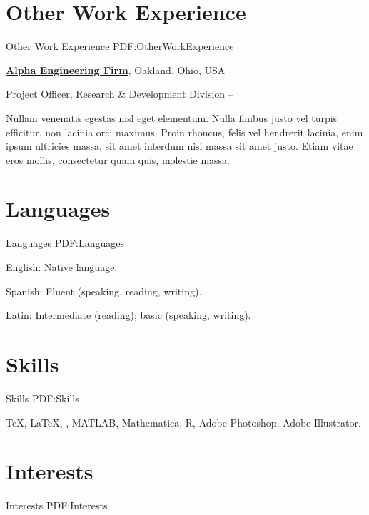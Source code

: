 \documentclass[letterpaper,MMMyyyy,nonstop]{simpleresumecv}
\begin{document}
\begin{body}

\section
{Other Work\newline
Experience}
{Other Work Experience}
{PDF:OtherWorkExperience}

\href{http://www.example.com/my-company}
{\textbf{Alpha Engineering Firm}},
Oakland, Ohio, USA

\GapNoBreak
\BulletItem
Project Officer,
Research \& Development Division
\hfill
{} --
\begin{detail}
\SubBulletItem
Nullam venenatis egestas nisl eget elementum.
\SubBulletItem
Nulla finibus justo vel turpis efficitur, non lacinia orci maximus. Proin rhoncus, felis vel hendrerit lacinia, enim ipsum ultricies massa, sit amet interdum nisi massa sit amet justo.
\SubBulletItem
Etiam vitae eros mollis, consectetur quam quis, molestie massa.
\end{detail}


\section
{Languages}
{Languages}
{PDF:Languages}

\BulletItem
English: Native language.

\GapNoBreak
\BulletItem
Spanish: Fluent (speaking, reading, writing).

\GapNoBreak
\BulletItem
Latin: Intermediate (reading); basic (speaking, writing).


\section
{Skills}
{Skills}
{PDF:Skills}

{\TeX}, {\LaTeX}, {\XeLaTeX},
MATLAB,
Mathematica,
R,
Adobe Photoshop,
Adobe Illustrator.


\section
{Interests}
{Interests}
{PDF:Interests}


\end{body}
\end{document}
